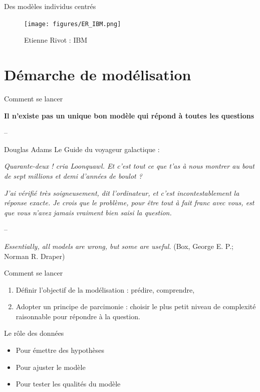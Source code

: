\documentclass[10pt,ignorenonframetext,]{beamer}
\providecommand{\tightlist}{%
  \setlength{\itemsep}{0pt}\setlength{\parskip}{0pt}}
\begin{document}
\begin{frame}{Des modèles individus centrés}

\begin{figure}
\centering
\texttt{[image: figures/ER\_IBM.png]}
\caption{Etienne Rivot : IBM}
\end{figure}

\end{frame}

\section{Démarche de modélisation}\label{demarche-de-modelisation}

\begin{frame}{Comment se lancer}

\textbf{Il n'existe pas un unique bon modèle qui répond à toutes les
questions}

--

Douglas Adams Le Guide du voyageur galactique :

\emph{Quarante-deux ! cria Loonquawl. Et c'est tout ce que t'as à nous
montrer au bout de sept millions et demi d'années de boulot ?}

\emph{J'ai vérifié très soigneusement, dit l'ordinateur, et c'est
incontestablement la réponse exacte. Je crois que le problème, pour être
tout à fait franc avec vous, est que vous n'avez jamais vraiment bien
saisi la question. }

--

\emph{Essentially, all models are wrong, but some are useful.} (Box,
George E. P.; Norman R. Draper)

\end{frame}

\begin{frame}{Comment se lancer}

\begin{enumerate}
\def\labelenumi{\arabic{enumi}.}
\tightlist
\item
  Définir l'objectif de la modélisation : prédire, comprendre,
\item
  Adopter un principe de parcimonie : choisir le plus petit niveau de
  complexité raisonnable pour répondre à la question.
\end{enumerate}

\end{frame}

\begin{frame}{Le rôle des données}

\begin{itemize}
\tightlist
\item
  Pour émettre des hypothèses
\item
  Pour ajuster le modèle
\item
  Pour tester les qualités du modèle
\end{itemize}

\end{frame}
\end{document}
